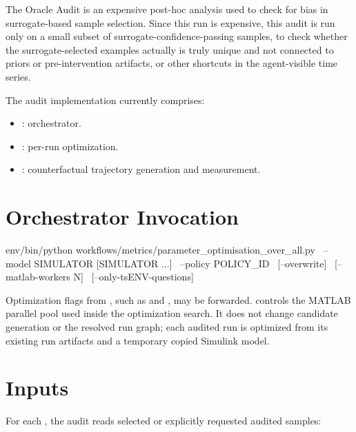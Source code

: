 \documentclass[11pt]{article}
\begin{document}
\label{docstart:oracle_audit}

The Oracle Audit is an expensive post-hoc analysis used to check for bias in surrogate-based sample selection.
Since this run is expensive, this audit is run only on a small subset of surrogate-confidence-passing samples, to check whether the surrogate-selected examples actually is truly unique and not connected to priors or pre-intervention artifacts, or other shortcuts in the agent-visible time series.

The audit implementation currently comprises:

\begin{itemize}
\item {}: orchestrator.
\item {}: per-run optimization.
\item {}: counterfactual trajectory generation and measurement.
\end{itemize}

\section*{Orchestrator Invocation}

\begin{DocCode}
env/bin/python workflows/metrics/parameter_optimisation_over_all.py \
  --model SIMULATOR [SIMULATOR ...] \
  --policy POLICY_ID \
  [--overwrite] \
  [--matlab-workers N] \
  [--only-tsENV-questions]
\end{DocCode}

Optimization flags from , such as  and , may be forwarded.
\code{--matlab-workers} controls the MATLAB parallel pool used inside the optimization search.
It does not change candidate generation or the resolved run graph; each audited run is optimized from its existing run artifacts and a temporary copied Simulink model.

\section*{Inputs}

For each \termSimulator, the audit reads selected or explicitly requested audited samples:
\end{document}
